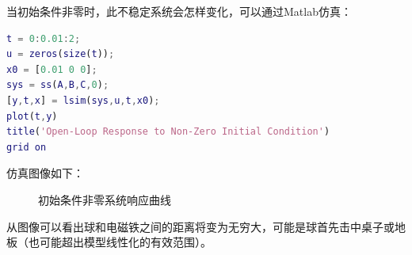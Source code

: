 \documentclass[UTF8]{ctexart}
\begin{document}
\par 当初始条件非零时，此不稳定系统会怎样变化，可以通过Matlab仿真：
\par  \begin{lstlisting}[language=matlab,escapeinside=``]
t = 0:0.01:2;
u = zeros(size(t));
x0 = [0.01 0 0];
sys = ss(A,B,C,0);
[y,t,x] = lsim(sys,u,t,x0);
plot(t,y)
title('Open-Loop Response to Non-Zero Initial Condition')
grid on
\end{lstlisting}
\par 仿真图像如下：
\newpage
\par \begin{figure}[ht]   
  \caption{\label{1} 初始条件非零系统响应曲线}      
 \end{figure}
\par 从图像可以看出球和电磁铁之间的距离将变为无穷大，可能是球首先击中桌子或地板（也可能超出模型线性化的有效范围）。
\end{document}
